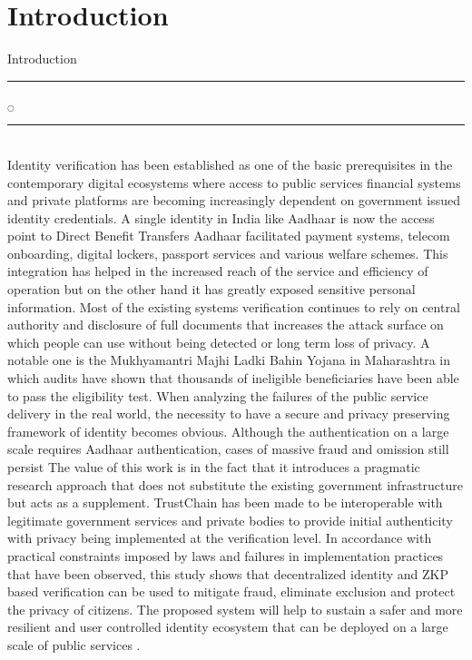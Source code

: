 \chapter[Introduction]{Introduction}{Introduction}\label{Intro}

\noindent
\rule{0.49\textwidth}{0.75pt} $_{\bigcirc}$ \rule{0.49\textwidth}{0.75pt}\\
Identity verification has been established as one of the basic prerequisites in the contemporary digital ecosystems where access to public services financial systems and private platforms are becoming increasingly dependent on government issued identity credentials. A single identity in India like Aadhaar is now the access point to Direct Benefit Transfers Aadhaar facilitated payment systems, telecom onboarding, digital lockers, passport services and various welfare schemes. This integration has helped in the increased reach of the service and efficiency of operation but on the other hand it has greatly exposed sensitive personal information. Most of the existing systems verification continues to rely on central authority and disclosure of full documents that increases the attack surface on which people can use without being detected or long term loss of privacy. A notable one is the Mukhyamantri Majhi Ladki Bahin Yojana in Maharashtra in which audits have shown that thousands of ineligible beneficiaries have been able to pass the eligibility test. 
When analyzing the failures of the public service delivery in the real world, the necessity to have a secure and privacy preserving framework of identity becomes obvious. Although the authentication on a large scale requires Aadhaar authentication, cases of massive fraud and omission still persist
The value of this work is in the fact that it introduces a pragmatic research approach that does not substitute the existing government infrastructure but acts as a supplement. TrustChain has been made to be interoperable with legitimate government services and private bodies to provide initial authenticity with privacy being implemented at the verification level. In accordance with practical constraints imposed by laws and failures in implementation practices that have been observed, this study shows that decentralized identity and ZKP based verification can be used to mitigate fraud, eliminate exclusion and protect the privacy of citizens. The proposed system will help to sustain a safer and more resilient and user controlled identity ecosystem that can be deployed on a large scale of public services
.\\
\noindent

